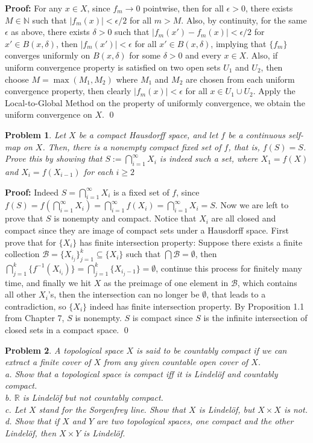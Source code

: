 \documentclass[12pt]{article}
\newtheorem{problem}{Problem}
\begin{document}
\textbf{Proof:} For any $x\in X$, since $f_m\to0$ pointwise, then for all $\epsilon>0$, there exists $M\in\mathbb{N}$ such that $|f_m(x)|<\epsilon/2$ for all $m>M$. Also, by continuity, for the same $\epsilon$ as above, there exists $\delta>0$ such that $|f_m(x')-f_m(x)|<\epsilon/2$ for $x'\in B(x,\delta)$, then $|f_m(x')|<\epsilon$ for all $x'\in B(x,\delta)$, implying that $\{f_m\}$ converges uniformly on $B(x,\delta)$ for some $\delta>0$ and every $x\in X$. Also, if uniform convergence property is satisfied on two open sets $U_1$ and $U_2$, then choose $M=\max(M_1, M_2)$ where $M_1$ and $M_2$ are chosen from each uniform convergence property, then clearly $|f_m(x)|<\epsilon$ for all $x\in U_1\cup U_2$. Apply the Local-to-Global Method on the property of uniformly convergence, we obtain the uniform convergence on $X$. \qed
\\
\begin{problem}
Let $X$ be a compact Hausdorff space, and let $f$ be a continuous self-map on $X$. Then, there is a nonempty compact fixed set of $f$, that is, $f(S)=S$. Prove this by showing that $S:= \bigcap_{i=1}^{\infty} X_i$ is indeed such a set, where $X_1=f(X)$ and $X_i=f(X_{i-1})$ for each $i\geq 2$
\end{problem}

\textbf{Proof:} Indeed $S=\bigcap_{i=1}^\infty X_i$ is a fixed set of $f$, since $f(S)=f(\bigcap_{i=1}^\infty X_i)=\bigcap_{i=1}^{\infty}f(X_i)=\bigcap_{i=1}^\infty X_i=S$. Now we are left to prove that $S$ is nonempty and compact. Notice that $X_i$ are all closed and compact since they are image of compact sets under a Hausdorff space. First prove that for $\{X_i\}$ has finite intersection property: Suppose there exists a finite collection $\mathcal{B}=\{X_{i_j}\}_{j=1}^k\subseteq\{X_i\}$ such that $\bigcap\mathcal{B}=\emptyset$, then $\bigcap_{j=1}^{k}\{f^{-1}(X_{i_{i}})\}=\bigcap_{j=1}^{k}\{X_{i_{j}-1}\}=\emptyset$, continue this process for finitely many time, and finally we hit $X$ as the preimage of one element in $\mathcal{B}$, which contains all other $X_i$'s, then the intersection can no longer be $\emptyset$, that leads to a contradiction, so $\{X_i\}$ indeed has finite intersection property. By Proposition 1.1 from Chapter 7, $S$ is nonempty. $S$ is compact since $S$ is the infinite intersection of closed sets in a compact space. \qed
\\
\begin{problem}
A topological space $X$ is said to be countably compact if we can extract a finite cover of $X$ from any given countable open cover of $X$. \\
\indent a. Show that a topological space is compact iff it is Lindelöf and countably compact. \\
\indent b. $\mathbb{R}$ is Lindelöf but not countably compact. \\
\indent c. Let $X$ stand for the Sorgenfrey line. Show that $X$ is Lindelöf, but $X\times X$ is not. \\
\indent d. Show that if $X$ and $Y$ are two topological spaces, one compact and the other Lindelöf, then $X\times Y$ is Lindelöf.
\end{problem}
\end{document}
